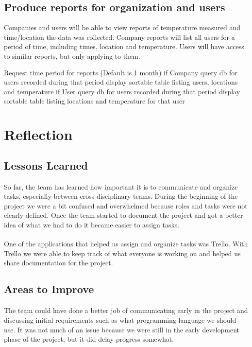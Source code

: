 \documentclass[12pt, letterpaper]{article}
\begin{document}
    \subsection{Produce reports for organization and users}
    Companies and users will be able to view reports of temperature measured and time/location the data was collected.
    Company reports will list all users for a period of time, including times, location and temperature.  Users will have
    access to similar reports, but only applying to them.
    \begin{algorithm}
        Request time period for reports (Default is 1 month)
        if Company
            query db for users recorded during that period
            display sortable table listing users, locations and temperature
        if User
            query db for users recorded during that period
            display sortable table listing locations and temperature for that user
    \end{algorithm}
    \section{Reflection}
    \subsection{Lessons Learned}
    \paragraph{}
    So far, the team has learned how important it is to communicate and organize tasks, 
    especially between cross disciplinary teams. During the beginning of the project we were a 
    bit confused and overwhelmed because roles and tasks were not clearly defined. Once the 
    team started to document the project and got a better idea of what we had to do it became 
    easier to assign tasks.
    \paragraph{}
    One of the applications that helped us assign and organize tasks was Trello. With Trello we 
    were able to keep track of what everyone is working on and helped us share documentation 
    for the project.
    \subsection{Areas to Improve}
    \paragraph{}
    The team could have done a better job of communicating early in the project and discussing 
    initial requirements such as what programming language we should use. It was not much of 
    an issue because we were still in the early development phase of the project, but it did 
    delay progress somewhat.
\end{document}
